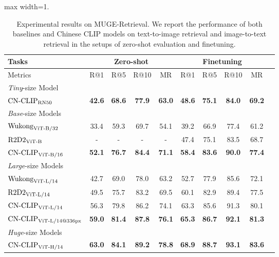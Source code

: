 \begin{table}[t]
\center
\small
\vskip 0.15in
\begin{adjustbox}{max width=1.\textwidth}
\begin{tabular}{@{\extracolsep{\fill}}lccccccccc}
\toprule
  Tasks
  &\multicolumn{4}{c}{Zero-shot}
  &\multicolumn{4}{c}{Finetuning}
  \\
\midrule
  Metrics & R@1 & R@5 & R@10 & MR & R@1 & R@5 & R@10 & MR
  \\
\midrule
    \multicolumn{9}{l}{\textit{Tiny}-size Model} \\
    $\text{CN-CLIP}\rm_{RN50}$
    & \textbf{42.6}	& \textbf{68.6}	& \textbf{77.9}	& \textbf{63.0}	& \textbf{48.6}	& \textbf{75.1}	& \textbf{84.0}	& \textbf{69.2}
    \\
\midrule
    \multicolumn{9}{l}{\textit{Base}-size Models} \\
    $\text{Wukong}\rm_{ViT\text{-}B/32}$
    & 33.4	& 59.3	& 69.7	& 54.1	& 39.2	& 66.9	& 77.4	& 61.2
    \\
    $\text{R2D2}\rm_{ViT\text{-}B}$
    & -	& -	& -	& -	& 47.4	& 75.1	& 83.5	& 68.7
    \\
    $\text{CN-CLIP}\rm_{ViT\text{-}B/16}$
    & \textbf{52.1}	& \textbf{76.7}	& \textbf{84.4}	& \textbf{71.1}	& \textbf{58.4}	& \textbf{83.6}	& \textbf{90.0}	& \textbf{77.4}
    \\
\midrule
    \multicolumn{9}{l}{\textit{Large}-size Models} \\
    $\text{Wukong}\rm_{ViT\text{-}L/14}$
    & 42.7	& 69.0	& 78.0	& 63.2	& 52.7	& 77.9	& 85.6	& 72.1
    \\
    $\text{R2D2}\rm_{ViT\text{-}L/14}$
    & 49.5 	& 75.7 	& 83.2	& 69.5	& 60.1 	& 82.9 	& 89.4 	& 77.5
    \\
    $\text{CN-CLIP}\rm_{ViT\text{-}L/14}$
    & 56.3	& 79.8	& 86.2	& 74.1	& 63.3	& 85.6	& 91.3	& 80.1
    \\
    $\text{CN-CLIP}\rm_{ViT\text{-}L/14@336px}$
    & \textbf{59.0}	& \textbf{81.4}	& \textbf{87.8}	& \textbf{76.1}	& \textbf{65.3}	& \textbf{86.7}	& \textbf{92.1}	& \textbf{81.3}
    \\
\midrule
    \multicolumn{9}{l}{\textit{Huge}-size Models} \\
    $\text{CN-CLIP}\rm_{ViT\text{-}H/14}$
    & \textbf{63.0}	& \textbf{84.1}	& \textbf{89.2}	& \textbf{78.8}	& \textbf{68.9}	& \textbf{88.7}	& \textbf{93.1}	& \textbf{83.6}
    \\
\bottomrule
\end{tabular}
\end{adjustbox}
\caption{Experimental results on MUGE-Retrieval. We report the performance of both baselines and Chinese CLIP models on text-to-image retrieval and image-to-text retrieval in the setups of zero-shot evaluation and finetuning. }
\label{tb:muge}
\end{table}



